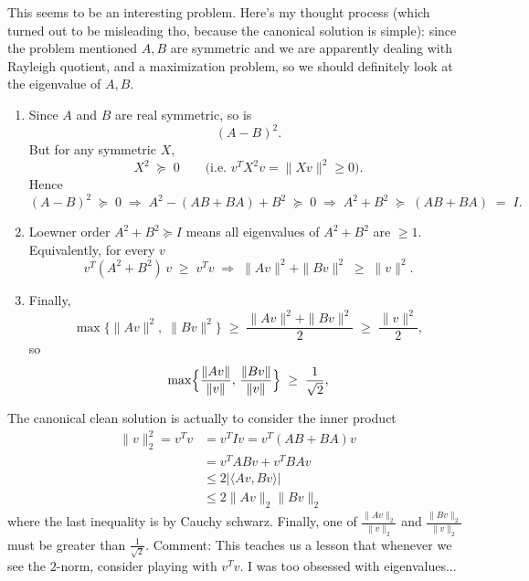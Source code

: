 \documentclass[../main]{subfiles}
\begin{document}
\begin{solution}
    This seems to be an interesting problem. Here's my thought process (which turned out to be misleading tho, because the canonical solution is simple): since the problem mentioned $A,B$ are symmetric and we are apparently dealing with Rayleigh quotient, and a maximization problem, so we should definitely look at the eigenvalue of $A,B$.
    \begin{enumerate}
        \item Since \(A\) and \(B\) are real symmetric, so is
            \[
            (A - B)^2.
            \]
            But for any symmetric \(X\),  
            \[
            X^2\;\succeq\;0
            \qquad\bigl(\text{i.e.\ }v^T X^2 v = \|Xv\|^2\ge0\bigr).
            \]
            Hence
            \[
            (A-B)^2 \;\succeq\;0
            \;\Longrightarrow\;
            A^2 - (AB+BA) + B^2 \;\succeq\;0
            \;\Longrightarrow\;
            A^2 + B^2 \;\succeq\;(AB+BA)\;=\;I.
            \]
            \item Loewner order \(A^2+B^2\succeq I\) means all eigenvalues of \(A^2+B^2\) are \(\ge 1\).  Equivalently, for every \(v\)
            \[
            v^T(A^2+B^2)\,v
            \;\ge\;v^T v
            \;\Longrightarrow\;
            \|Av\|^2 + \|Bv\|^2 \;\ge\;\|v\|^2.
            \]
            \item Finally,
                \[
                \max\{\|Av\|^2,\;\|Bv\|^2\}
                \;\ge\;\frac{\|Av\|^2 + \|Bv\|^2}{2}
                \;\ge\;\frac{\|v\|^2}{2},
                \]
                so
                \[
                \max\Bigl\{\frac{\|Av\|}{\|v\|},\,\frac{\|Bv\|}{\|v\|}\Bigr\}
                \;\ge\;\frac1{\sqrt 2},
                \]
    \end{enumerate}

    The canonical clean solution is actually to consider the inner product
    \begin{align*}
        \|v\|_2^2 =v^T v &= v^T I v = v^T(AB+BA)v\\
        &= v^T AB v + v^T BA v\\
        &\leq 2 |\langle Av, Bv \rangle| \\
        &\le 2 \|Av\|_2 \|Bv\|_2    
        \end{align*}
        where the last inequality is by Cauchy schwarz.
        \newline
        Finally, one of $\frac{\|Av\|_2}{\|v\|_2}$ and $\frac{\|Bv\|_2}{\|v\|_2}$ must be greater than $\frac{1}{\sqrt{2}}$. 
        \newline
        Comment: This teaches us a lesson that whenever we see the $2$-norm, consider playing with $v^Tv$. I was too obsessed with eigenvalues...
\end{solution} 
\end{document}
